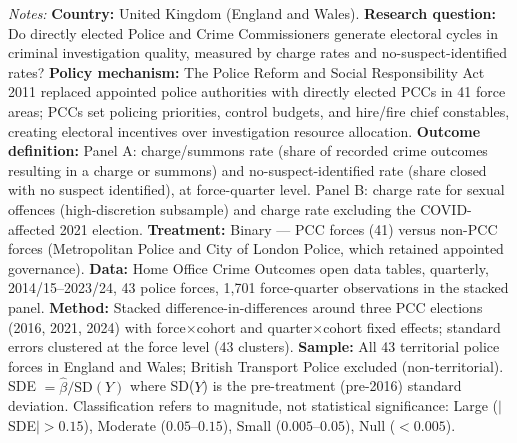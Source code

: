 \begin{table}[htbp]
\begin{tablenotes}[flushleft]
\item \textit{Notes:} \textbf{Country:} United Kingdom (England and Wales). \textbf{Research question:} Do directly elected Police and Crime Commissioners generate electoral cycles in criminal investigation quality, measured by charge rates and no-suspect-identified rates? \textbf{Policy mechanism:} The Police Reform and Social Responsibility Act 2011 replaced appointed police authorities with directly elected PCCs in 41 force areas; PCCs set policing priorities, control budgets, and hire/fire chief constables, creating electoral incentives over investigation resource allocation. \textbf{Outcome definition:} Panel A: charge/summons rate (share of recorded crime outcomes resulting in a charge or summons) and no-suspect-identified rate (share closed with no suspect identified), at force-quarter level. Panel B: charge rate for sexual offences (high-discretion subsample) and charge rate excluding the COVID-affected 2021 election. \textbf{Treatment:} Binary --- PCC forces (41) versus non-PCC forces (Metropolitan Police and City of London Police, which retained appointed governance). \textbf{Data:} Home Office Crime Outcomes open data tables, quarterly, 2014/15--2023/24, 43 police forces, 1,701 force-quarter observations in the stacked panel. \textbf{Method:} Stacked difference-in-differences around three PCC elections (2016, 2021, 2024) with force$\times$cohort and quarter$\times$cohort fixed effects; standard errors clustered at the force level (43 clusters). \textbf{Sample:} All 43 territorial police forces in England and Wales; British Transport Police excluded (non-territorial). SDE $= \hat{\beta} / \text{SD}(Y)$ where SD($Y$) is the pre-treatment (pre-2016) standard deviation. Classification refers to magnitude, not statistical significance: Large ($|$SDE$| > 0.15$), Moderate ($0.05$--$0.15$), Small ($0.005$--$0.05$), Null ($< 0.005$).
\end{tablenotes}
\end{table}

